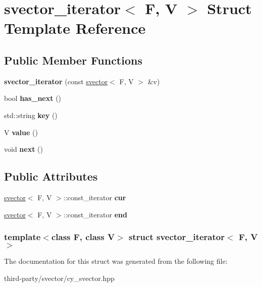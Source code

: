 \hypertarget{structsvector__iterator}{
\section{svector\_\-iterator$<$ F, V $>$ Struct Template Reference}
\label{structsvector__iterator}
}
\subsection*{Public Member Functions}
\begin{DoxyCompactItemize}
\item 
\hypertarget{structsvector__iterator_a9df4f9b2ba35a3cf8d37b14eb65a7569}{
{\bfseries svector\_\-iterator} (const \hyperlink{classsvector}{svector}$<$ F, V $>$ \&v)}
\label{structsvector__iterator_a9df4f9b2ba35a3cf8d37b14eb65a7569}

\item 
\hypertarget{structsvector__iterator_af9575b53254c6310119fd26c5431d829}{
bool {\bfseries has\_\-next} ()}
\label{structsvector__iterator_af9575b53254c6310119fd26c5431d829}

\item 
\hypertarget{structsvector__iterator_a9f5a8e681ff60bc2927ae23ceae89382}{
std::string {\bfseries key} ()}
\label{structsvector__iterator_a9f5a8e681ff60bc2927ae23ceae89382}

\item 
\hypertarget{structsvector__iterator_a304645ceb8f8cc2787c28eb21361b1df}{
V {\bfseries value} ()}
\label{structsvector__iterator_a304645ceb8f8cc2787c28eb21361b1df}

\item 
\hypertarget{structsvector__iterator_a562232829f10632a653d8c236732667d}{
void {\bfseries next} ()}
\label{structsvector__iterator_a562232829f10632a653d8c236732667d}

\end{DoxyCompactItemize}
\subsection*{Public Attributes}
\begin{DoxyCompactItemize}
\item 
\hypertarget{structsvector__iterator_aec777d24426ae5b31c9bf0d0276c9073}{
\hyperlink{classsvector}{svector}$<$ F, V $>$::const\_\-iterator {\bfseries cur}}
\label{structsvector__iterator_aec777d24426ae5b31c9bf0d0276c9073}

\item 
\hypertarget{structsvector__iterator_a7e548db78add9057ecf4178dd1552f2d}{
\hyperlink{classsvector}{svector}$<$ F, V $>$::const\_\-iterator {\bfseries end}}
\label{structsvector__iterator_a7e548db78add9057ecf4178dd1552f2d}

\end{DoxyCompactItemize}
\subsubsection*{template$<$class F, class V$>$ struct svector\_\-iterator$<$ F, V $>$}



The documentation for this struct was generated from the following file:\begin{DoxyCompactItemize}
\item 
third-\/party/svector/cy\_\-svector.hpp\end{DoxyCompactItemize}
